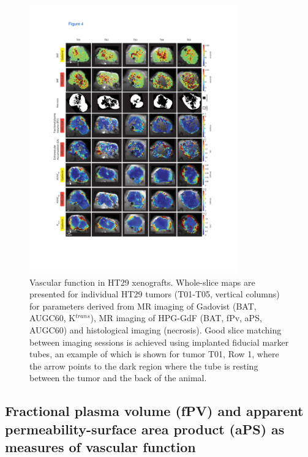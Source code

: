 \begin{figure}[htbp]   
 \begin{center}  
 \includegraphics[width=0.8\textwidth]{hpg/hpg-paper1-images/hpg_fig4-ht29.pdf}
 \caption{Vascular function in HT29 xenografts. Whole-slice maps are presented for individual HT29 tumors (T01-T05, vertical columns) for parameters derived from MR imaging of Gadovist (BAT, AUGC60, K$^{trans}$), MR imaging of HPG-GdF (BAT, fPv, aPS, AUGC60) and histological imaging (necrosis). Good slice matching between imaging sessions is achieved using implanted fiducial marker tubes, an example of which is shown for tumor T01, Row 1, where the arrow points to the dark region where the tube is resting between the tumor and the back of the animal.}  
 \label{hpgpaper1:fig4}  
 \end{center}
\end{figure}

\subsection{Fractional plasma volume (fPV) and apparent permeability-surface area product (aPS) as measures of vascular function}


